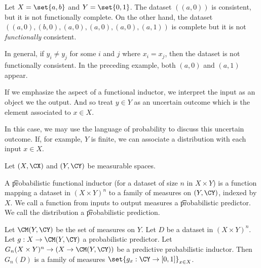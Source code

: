 

Let $X = \set{a, b}$ and $Y = \set{0, 1}$.
The dataset $((a, 0))$ is consistent, but it is not functionally complete.
On the other hand, the dataset $((a,0), (b,0), (a,0), (a,0), (a,0), (a, 1))$
is complete but it is not \textit{functionally} consistent.

In general, if $y_i \neq y_j$ for some $i$ and $j$ where $x_i = x_j$, then the dataset is not functionally consistent.
In the preceding example, both $(a, 0)$ and $(a, 1)$ appear.

If we emphasize the  aspect of a functional inductor, we interpret the input as an object we  the output.
And so treat $y \in Y$ as an uncertain outcome which is the element associated to $x \in X$.

In this case, we may use the language of probability to discuss this uncertain outcome.
If, for example, $Y$ is finite, we can associate a distribution with each input $x \in X$.


Let $(X, \CX)$ and $(Y, \CY)$ be measurable spaces.

A \t{probabilistic functional inductor} (for a dataset of size $n$ in $X \times Y$) is a function mapping a dataset in $(X \times Y)^n$ to a family of measures on $(Y, \CY)$, indexed by $X$.
We call a function from inputs to output measures a \t{probabilistic predictor}.
We call the distribution a \t{probabilistic prediction}.


Let $\CM(Y, \CY)$ be the set of measures on $Y$.
Let $D$ be a dataset in $(X \times Y)^n$.
Let $g: X \to \CM(Y, \CY)$  a probabilistic predictor.
Let $G_n (X \times Y)^n \to (X \to \CM(Y, \CY))$ be a predictive probabilistic inductor.
Then $G_n(D)$ is a family of measures $\set{g_x: \CY \to [0, 1]}_{x \in X}$.


\blankpage

